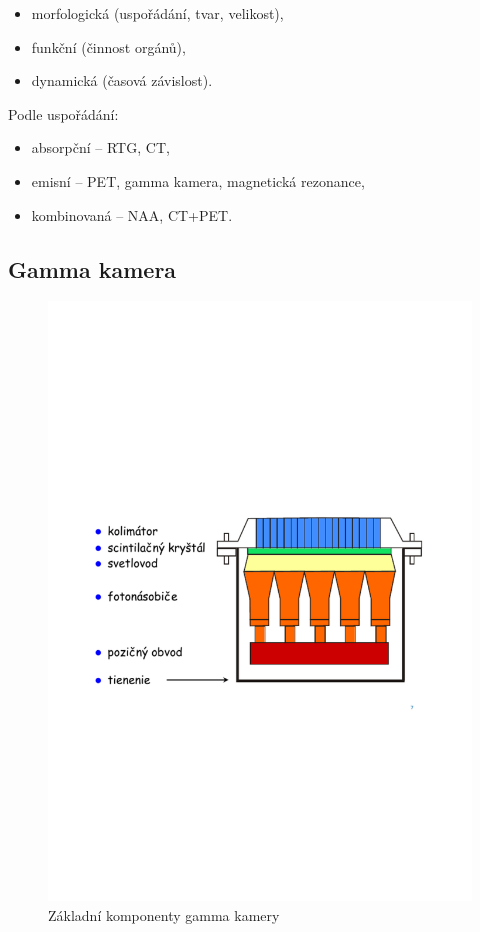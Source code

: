 \begin{itemize}
    \item morfologická (uspořádání, tvar, velikost),
    \item funkční (činnost orgánů),
    \item dynamická (časová závislost).
\end{itemize}

Podle uspořádání:

\begin{itemize}
    \item absorpční -- RTG, CT,
    \item emisní -- PET, gamma kamera, magnetická rezonance,
    \item kombinovaná -- NAA, CT+PET.
    
\end{itemize}

\subsection{Gamma kamera}

\begin{figure}[H]
    \centering
    \includegraphics[width=0.55\linewidth, trim={2cm 10cm 2cm 10cm}, clip]{img/gamma_kamera.pdf}
    \caption{Základní komponenty gamma kamery}
    \label{fig:2_5_gamma_kamera}
\end{figure}

